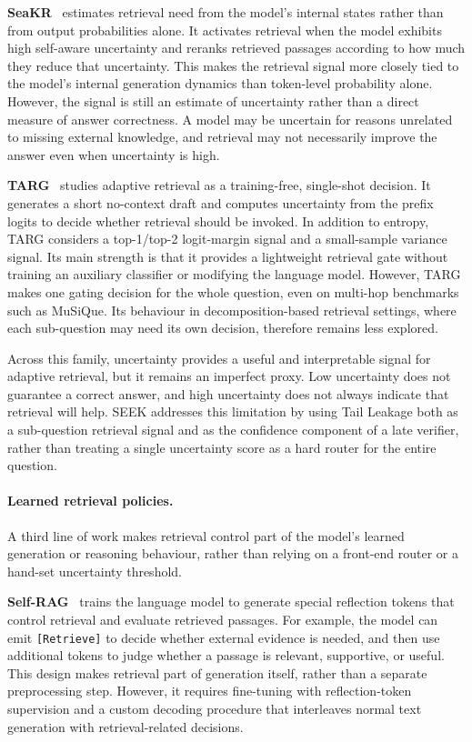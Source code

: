 \textbf{SeaKR}~\cite{seakr} estimates retrieval need from the model's internal states rather than from output probabilities alone. It activates retrieval when the model exhibits high self-aware uncertainty and reranks retrieved passages according to how much they reduce that uncertainty. This makes the retrieval signal more closely tied to the model's internal generation dynamics than token-level probability alone. However, the signal is still an estimate of \mbox{uncertainty} rather than a direct measure of answer correctness. A model may be uncertain for reasons unrelated to missing external knowledge, and retrieval may not necessarily improve the answer even when uncertainty is high.

\textbf{TARG}~\cite{targ} studies adaptive retrieval as a training-free, single-shot decision. It generates a short no-context draft and computes uncertainty from the prefix logits to decide whether retrieval should be invoked. In addition to entropy, TARG considers a top-1/top-2 logit-margin signal and a small-sample variance signal. Its main strength is that it \mbox{provides} a lightweight retrieval gate without training an auxiliary classifier or modifying the language model. However, TARG makes one gating decision for the whole question, even on multi-hop benchmarks such as MuSiQue. Its behaviour in decomposition-based retrieval settings, where each sub-question may need its own decision, therefore remains less explored.

Across this family, uncertainty provides a useful and interpretable signal for adaptive retrieval, but it remains an imperfect proxy. Low uncertainty does not guarantee a correct answer, and high uncertainty does not always indicate that retrieval will help. SEEK addresses this limitation by using Tail Leakage both as a sub-question retrieval signal and as the confidence component of a late verifier, rather than treating a single uncertainty score as a hard router for the entire question.

\paragraph{Learned retrieval policies.}

A third line of work makes retrieval control part of the model's learned generation or reasoning behaviour, rather than relying on a front-end router or a hand-set uncertainty threshold.

\textbf{Self-RAG}~\cite{selfrag} trains the language model to generate special reflection tokens that control retrieval and evaluate retrieved passages. For example, the model can emit \texttt{[Retrieve]} to decide whether external evidence is needed, and then use additional tokens to judge whether a passage is relevant, supportive, or useful. This design makes retrieval part of generation itself, rather than a separate preprocessing step. However, it requires fine-tuning with reflection-token supervision and a custom decoding procedure that interleaves normal text generation with retrieval-related decisions.

